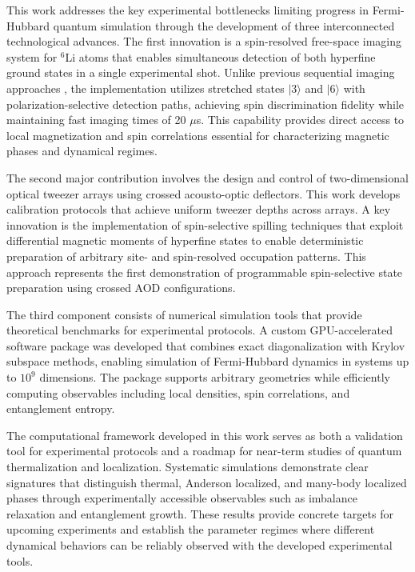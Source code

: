 
This work addresses the key experimental bottlenecks limiting progress in Fermi-Hubbard quantum simulation through the development of three interconnected technological advances. The first innovation is a spin-resolved free-space imaging system for $^6$Li atoms that enables simultaneous detection of both hyperfine ground states in a single experimental shot. Unlike previous sequential imaging approaches \cite{bergschneider_spin-resolved_2018}, the implementation utilizes stretched states $|3\rangle$ and $|6\rangle$ with polarization-selective detection paths, achieving  spin discrimination fidelity while maintaining fast imaging times of 20 $\mu$s. This capability provides direct access to local magnetization and spin correlations essential for characterizing magnetic phases and dynamical regimes.

The second major contribution involves the design and control of two-dimensional optical tweezer arrays using crossed acousto-optic deflectors. This work develops calibration protocols that achieve uniform tweezer depths across arrays. A key innovation is the implementation of spin-selective spilling techniques that exploit differential magnetic moments of hyperfine states to enable deterministic preparation of arbitrary site- and spin-resolved occupation patterns. This approach represents the first demonstration of programmable spin-selective state preparation using crossed AOD configurations.

The third component consists of numerical simulation tools that provide theoretical benchmarks for experimental protocols. A custom GPU-accelerated software package was developed that combines exact diagonalization with Krylov subspace methods, enabling simulation of Fermi-Hubbard dynamics in systems up to $10^9$ dimensions. The package supports arbitrary geometries while efficiently computing observables including local densities, spin correlations, and entanglement entropy.

The computational framework developed in this work serves as both a validation tool for experimental protocols and a roadmap for near-term studies of quantum thermalization and localization. Systematic simulations demonstrate clear signatures that distinguish thermal, Anderson localized, and many-body localized phases through experimentally accessible observables such as imbalance relaxation and entanglement growth. These results provide concrete targets for upcoming experiments and establish the parameter regimes where different dynamical behaviors can be reliably observed with the developed experimental tools.

